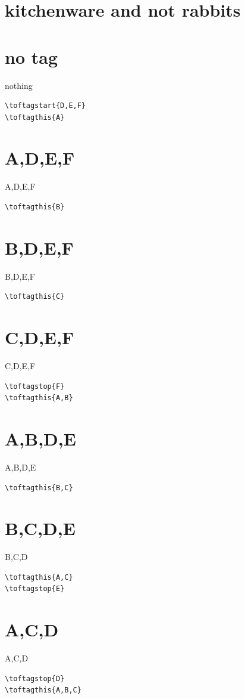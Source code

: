 \documentclass{article}
\begin{document}
\section*{kitchenware and not rabbits}
\clearpage
\section{no tag}
nothing
\begin{verbatim}
\toftagstart{D,E,F}
\toftagthis{A}
\end{verbatim}
\section{A,D,E,F}
A,D,E,F
\begin{verbatim}
\toftagthis{B}
\end{verbatim}
\section{B,D,E,F}
B,D,E,F
\begin{verbatim}
\toftagthis{C}
\end{verbatim}
\section{C,D,E,F}
C,D,E,F
\begin{verbatim}
\toftagstop{F}
\toftagthis{A,B}
\end{verbatim}
\section{A,B,D,E}
A,B,D,E
\begin{verbatim}
\toftagthis{B,C}
\end{verbatim}
\section{B,C,D,E}
B,C,D
\begin{verbatim}
\toftagthis{A,C}
\toftagstop{E}
\end{verbatim}
\section{A,C,D}
A,C,D
\begin{verbatim}
\toftagstop{D}
\toftagthis{A,B,C}
\end{verbatim}
\end{document}

